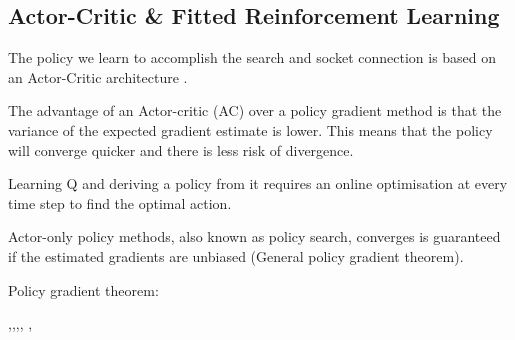 \subsection{Actor-Critic \& Fitted Reinforcement Learning}

The policy we learn to accomplish the search and socket connection is based on an Actor-Critic architecture
\cite[Chap. 6.6]{Sutton00policygradient}.




The advantage of an Actor-critic (AC) over a policy gradient method is that the variance of the
expected gradient estimate is lower. This means that the policy will converge quicker and there is less risk of divergence.

Learning Q and deriving a policy from it requires an online optimisation at every time step to find the optimal action.


Actor-only policy methods, also known as policy search, converges is guaranteed if the estimated
gradients are unbiased (General policy gradient theorem). 



Policy gradient theorem: 

\cite{rl_ac_surv_2012}

\cite{Sutton00policygradient} %

\cite{Boyan95generalizationin} %

\cite[Chap 6.6]{sutton98a}


\cite{rl_ac_surv_2012}


\cite{fqi_nips_peter_2009},\cite{batch_synth_traj_2013},\cite{fnac_ca_2008},\cite{Riedmiller2005}, \cite{EGW05}, \cite{rl_gmm_2010}
\cite{fvi_uav_2010}
\cite{mnih-dqn-2015}
\cite{neura_fqi_2005}
\cite{DRQ_AAAI_2015}

